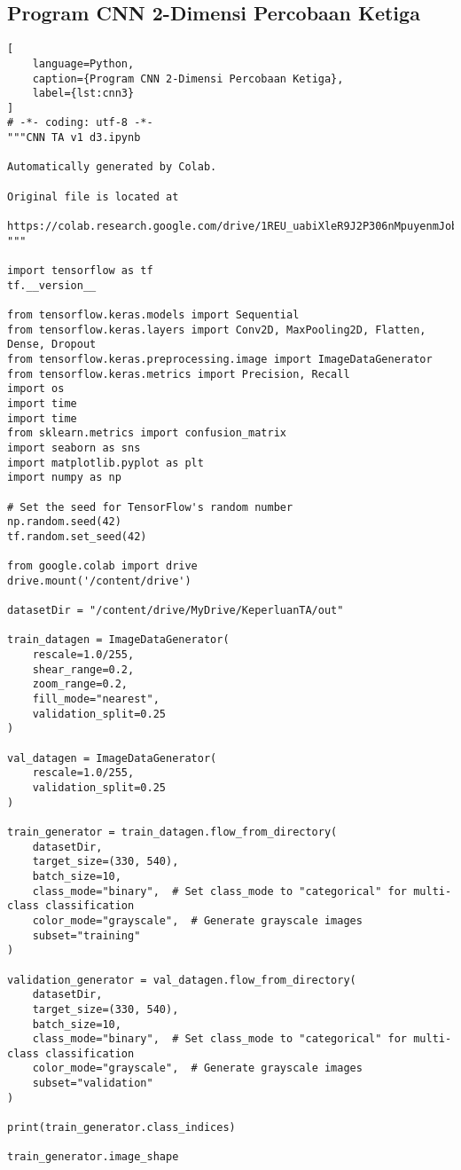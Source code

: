 \subsection*{Program CNN 2-Dimensi Percobaan Ketiga}
\begin{lstlisting}[
    language=Python,
    caption={Program CNN 2-Dimensi Percobaan Ketiga},
    label={lst:cnn3}
]
# -*- coding: utf-8 -*-
"""CNN TA v1 d3.ipynb

Automatically generated by Colab.

Original file is located at
    https://colab.research.google.com/drive/1REU_uabiXleR9J2P306nMpuyenmJobka
"""

import tensorflow as tf
tf.__version__

from tensorflow.keras.models import Sequential
from tensorflow.keras.layers import Conv2D, MaxPooling2D, Flatten, Dense, Dropout
from tensorflow.keras.preprocessing.image import ImageDataGenerator
from tensorflow.keras.metrics import Precision, Recall
import os
import time
import time
from sklearn.metrics import confusion_matrix
import seaborn as sns
import matplotlib.pyplot as plt
import numpy as np

# Set the seed for TensorFlow's random number
np.random.seed(42)
tf.random.set_seed(42)

from google.colab import drive
drive.mount('/content/drive')

datasetDir = "/content/drive/MyDrive/KeperluanTA/out"

train_datagen = ImageDataGenerator(
    rescale=1.0/255,
    shear_range=0.2,
    zoom_range=0.2,
    fill_mode="nearest",
    validation_split=0.25
)

val_datagen = ImageDataGenerator(
    rescale=1.0/255,
    validation_split=0.25
)

train_generator = train_datagen.flow_from_directory(
    datasetDir,
    target_size=(330, 540),
    batch_size=10,
    class_mode="binary",  # Set class_mode to "categorical" for multi-class classification
    color_mode="grayscale",  # Generate grayscale images
    subset="training"
)

validation_generator = val_datagen.flow_from_directory(
    datasetDir,
    target_size=(330, 540),
    batch_size=10,
    class_mode="binary",  # Set class_mode to "categorical" for multi-class classification
    color_mode="grayscale",  # Generate grayscale images
    subset="validation"
)

print(train_generator.class_indices)

train_generator.image_shape


\end{lstlisting}
